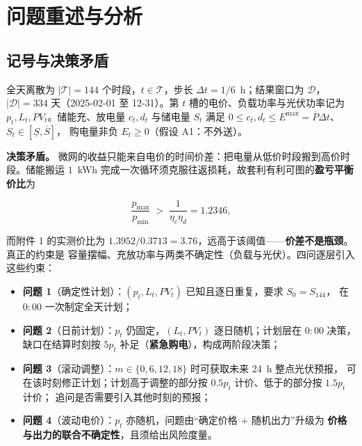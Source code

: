 
\section{问题重述与分析}\label{chap:problem}

\subsection{记号与决策矛盾}

全天离散为 \(|\mathcal T|=144\) 个时段，\(t\in\mathcal T\)，步长 \(\Delta t=1/6\)~h；结果窗口为
\(\mathcal D\)，\(|\mathcal D|=334\) 天（2025-02-01 至 12-31）。第 \(t\) 槽的电价、负载功率与光伏功率记为
\(p_t,L_t,PV_t\)。储能充、放电量 \(c_t,d_t\) 与储电量 \(S_t\) 满足
\(0\le c_t,d_t\le E^{\max}=\overline P\Delta t\)、\(S_t\in[\underline S,\overline S]\)，
购电量非负 \(E_t\ge0\)（假设 A1：不外送）。

\textbf{决策矛盾。} 微网的收益只能来自电价的时间价差：把电量从低价时段搬到高价时段。储能搬运
\(1\)~kWh 完成一次循环须克服往返损耗，故套利有利可图的\textbf{盈亏平衡价比}为

\begin{equation}
  \frac{p_{\max}}{p_{\min}}\;>\;\frac{1}{\eta_c\eta_d}=1.2346 ,
  \label{eq:ch1-arb}
\end{equation}

而附件 1 的实测价比为 \(1.3952/0.3713=3.76\)，远高于该阈值——\textbf{价差不是瓶颈}。真正的约束是
容量摆幅、充放功率与两类不确定性（负载与光伏）。四问逐层引入这些约束：

\begin{itemize}
  \item \textbf{问题 1}（确定性计划）：\((p_t,L_t,PV_t)\) 已知且逐日重复，要求 \(S_0=S_{144}\)，
        在 \(0{:}00\) 一次制定全天计划；
  \item \textbf{问题 2}（日前计划）：\(p_t\) 仍固定，\((L_t,PV_t)\) 逐日随机；计划层在 \(0{:}00\) 决策，
        缺口在结算时刻按 \(5p_t\) 补足（\textbf{紧急购电}），构成两阶段决策；
  \item \textbf{问题 3}（滚动调整）：\(m\in\{0,6,12,18\}\) 时可获取未来 24~h 整点光伏预报，
        可在该时刻修正计划；计划高于调整的部分按 \(0.5p_t\) 计价、低于的部分按 \(1.5p_t\) 计价；
        追问是否需要引入其他时刻的预报；
  \item \textbf{问题 4}（波动电价）：\(p_t\) 亦随机，问题由“确定价格 \(+\) 随机出力”升级为
        \textbf{价格与出力的联合不确定性}，且须给出风险度量。
\end{itemize}

